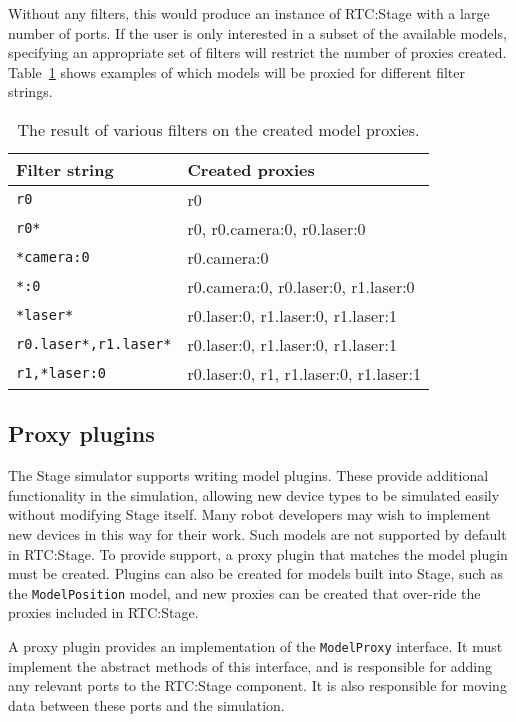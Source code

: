 \documentclass[a4paper,10pt]{article}
\begin{document}
Without any filters, this would produce an instance of RTC:Stage with a large
number of ports. If the user is only interested in a subset of the available
models, specifying an appropriate set of filters will restrict the number of
proxies created. Table~\ref{tab:filtered_proxies} shows examples of which
models will be proxied for different filter strings.

\begin{table}[t]
  \centering
  \begin{tabular}{ll}
    \toprule
    Filter string & Created proxies \\
    \midrule
    \verb|r0| & r0 \\
    \verb|r0*| & r0, r0.camera:0, r0.laser:0 \\
    \verb|*camera:0| & r0.camera:0 \\
    \verb|*:0| & r0.camera:0, r0.laser:0, r1.laser:0 \\
    \verb|*laser*| & r0.laser:0, r1.laser:0, r1.laser:1 \\
    \verb|r0.laser*,r1.laser*| & r0.laser:0, r1.laser:0, r1.laser:1 \\
    \verb|r1,*laser:0| & r0.laser:0, r1, r1.laser:0, r1.laser:1 \\
    \bottomrule
  \end{tabular}
  \caption{The result of various filters on the created model proxies.}
  \label{tab:filtered_proxies}
\end{table}

\subsection{Proxy plugins}
\label{sec1:proxy-plugins}

The Stage simulator supports writing model plugins. These provide additional
functionality in the simulation, allowing new device types to be simulated
easily without modifying Stage itself. Many robot developers may wish to
implement new devices in this way for their work. Such models are not supported
by default in RTC:Stage. To provide support, a proxy plugin that matches the
model plugin must be created. Plugins can also be created for models built into
Stage, such as the \verb|ModelPosition| model, and new proxies can be created
that over-ride the proxies included in RTC:Stage.

A proxy plugin provides an implementation of the \verb|ModelProxy| interface.
It must implement the abstract methods of this interface, and is responsible
for adding any relevant ports to the RTC:Stage component. It is also
responsible for moving data between these ports and the simulation.
\end{document}
